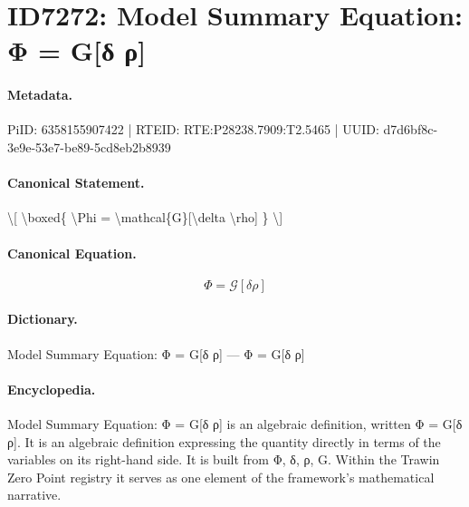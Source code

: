 \section*{ID7272: Model Summary Equation: Φ = G[δ ρ]}
\paragraph{Metadata.}
PiID: 6358155907422 | RTEID: RTE:P28238.7909:T2.5465 | UUID: d7d6bf8c-3e9e-53e7-be89-5cd8eb2b8939

\paragraph{Canonical Statement.}
\textbackslash{}[ \textbackslash{}boxed\{ \textbackslash{}Phi = \textbackslash{}mathcal\{G\}[\textbackslash{}delta \textbackslash{}rho] \} \textbackslash{}]

\paragraph{Canonical Equation.}
\[
\boxed{ \Phi = \mathcal{G}[\delta \rho] }
\]

\paragraph{Dictionary.}
Model Summary Equation: Φ = G[δ ρ] — Φ = G[δ ρ]

\paragraph{Encyclopedia.}
Model Summary Equation: Φ = G[δ ρ] is an algebraic definition, written Φ = G[δ ρ]. It is an algebraic definition expressing the quantity directly in terms of the variables on its right-hand side. It is built from Φ, δ, ρ, G. Within the Trawin Zero Point registry it serves as one element of the framework's mathematical narrative.
